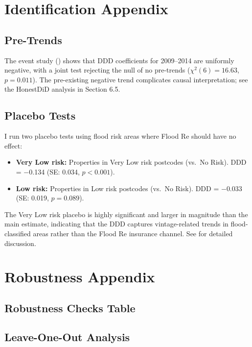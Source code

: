 \documentclass[12pt]{article}
\begin{document}
\section{Identification Appendix}

\subsection{Pre-Trends}

The event study () shows that DDD coefficients for 2009--2014 are uniformly negative, with a joint test rejecting the null of no pre-trends ($\chi^2(6) = 16.63$, $p = 0.011$). The pre-existing negative trend complicates causal interpretation; see the HonestDiD analysis in Section 6.5.

\subsection{Placebo Tests}

I run two placebo tests using flood risk areas where Flood Re should have no effect:

\begin{itemize}
\item \textbf{Very Low risk:} Properties in Very Low risk postcodes (vs.\ No Risk). DDD = $-$0.134 (SE: 0.034, $p < 0.001$).
\item \textbf{Low risk:} Properties in Low risk postcodes (vs.\ No Risk). DDD = $-$0.033 (SE: 0.019, $p = 0.089$).
\end{itemize}

The Very Low risk placebo is highly significant and larger in magnitude than the main estimate, indicating that the DDD captures vintage-related trends in flood-classified areas rather than the Flood Re insurance channel. See  for detailed discussion.

\section{Robustness Appendix}

\subsection{Robustness Checks Table}



\subsection{Leave-One-Out Analysis}
\end{document}
